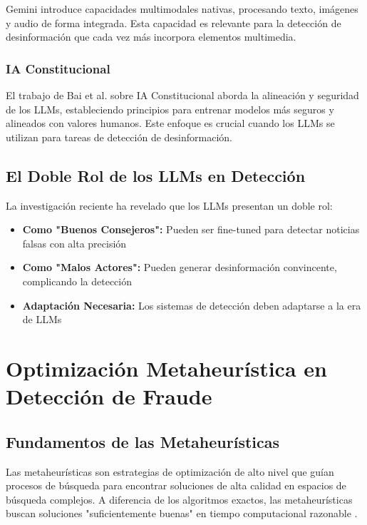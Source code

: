 Gemini \cite{gemini2023family} introduce capacidades multimodales nativas, procesando texto, imágenes y audio de forma integrada. Esta capacidad es relevante para la detección de desinformación que cada vez más incorpora elementos multimedia.

\subsubsection{IA Constitucional}

El trabajo de Bai et al. \cite{bai2022constitutional} sobre IA Constitucional aborda la alineación y seguridad de los LLMs, estableciendo principios para entrenar modelos más seguros y alineados con valores humanos. Este enfoque es crucial cuando los LLMs se utilizan para tareas de detección de desinformación.

\subsection{El Doble Rol de los LLMs en Detección}

La investigación reciente ha revelado que los LLMs presentan un doble rol:
\begin{itemize}
    \item \textbf{Como "Buenos Consejeros":} Pueden ser fine-tuned para detectar noticias falsas con alta precisión \cite{hu2024bad}
    \item \textbf{Como "Malos Actores":} Pueden generar desinformación convincente, complicando la detección \cite{su2023fake}
    \item \textbf{Adaptación Necesaria:} Los sistemas de detección deben adaptarse a la era de LLMs \cite{su2023adapting}
\end{itemize}

\section{Optimización Metaheurística en Detección de Fraude}
\label{sec:optimizacion_metaheuristica}

\subsection{Fundamentos de las Metaheurísticas}

Las metaheurísticas son estrategias de optimización de alto nivel que guían procesos de búsqueda para encontrar soluciones de alta calidad en espacios de búsqueda complejos. A diferencia de los algoritmos exactos, las metaheurísticas buscan soluciones "suficientemente buenas" en tiempo computacional razonable \cite{anselmo2013diseno}.

